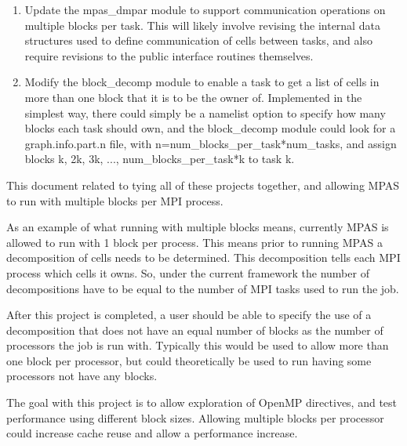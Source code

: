 \documentclass[11pt]{report}
\begin{document}
\begin{enumerate}
\item Update the mpas\_dmpar module to support communication operations on                              
   multiple blocks per task. This will likely involve revising the                                  
   internal data structures used to define communication of cells                                   
   between tasks, and also require revisions to the public interface                                
   routines themselves.                                                                             
                                                                                                    
\item Modify the block\_decomp module to enable a task to get a list of                                 
   cells in more than one block that it is to be the owner of.                                      
   Implemented in the simplest way, there could simply be a namelist                                
   option to specify how many blocks each task should own, and the                                  
   block\_decomp module could look for a graph.info.part.n file, with                                
   n=num\_blocks\_per\_task*num\_tasks, and assign blocks k, 2k, 3k, ...,                               
   num\_blocks\_per\_task*k to task k.    

\end{enumerate}                                                             

This document related to tying all of these projects together, and allowing
MPAS to run with multiple blocks per MPI process.

As an example of what running with multiple blocks means, currently MPAS is
allowed to run with 1 block per process. This means prior to running MPAS a
decomposition of cells needs to be determined. This decomposition tells each
MPI process which cells it owns. So, under the current framework the number of
decompositions have to be equal to the number of MPI tasks used to run the job. 

After this project is completed, a user should be able to specify the use of a
decomposition that does not have an equal number of blocks as the number of
processors the job is run with. Typically this would be used to allow more than
one block per processor, but could theoretically be used to run having some
processors not have any blocks.

The goal with this project is to allow exploration of OpenMP directives, and
test performance using different block sizes. Allowing multiple blocks per
processor could increase cache reuse and allow a performance increase.
\end{document}
